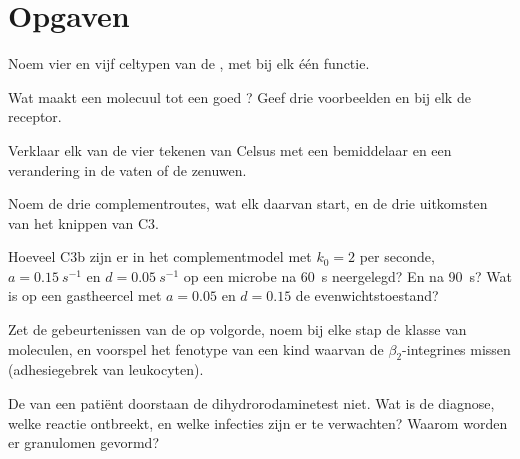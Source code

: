 \section{Opgaven}

\begin{exercise}[$\star$]\label{exo:b3:innate-immunity:1}
Noem vier  en vijf celtypen van de , met bij
elk één functie.
\end{exercise}

\begin{exercise}[$\star$]\label{exo:b3:innate-immunity:2}
Wat maakt een molecuul tot een goed ? Geef drie voorbeelden en bij elk de receptor.
\end{exercise}

\begin{exercise}[$\star$]\label{exo:b3:innate-immunity:3}
Verklaar elk van de vier tekenen van Celsus met een bemiddelaar en een
verandering in de vaten of de zenuwen.
\end{exercise}

\begin{exercise}[$\star$]\label{exo:b3:innate-immunity:4}
Noem de drie complementroutes, wat elk daarvan start, en de drie
uitkomsten van het knippen van C3.
\end{exercise}

\begin{exercise}[$\star\star$]\label{exo:b3:innate-immunity:5}
Hoeveel C3b zijn er in het complementmodel met $k_{0} = 2$ per seconde, $a =
\qty{0.15}{s^{-1}}$ en $d = \qty{0.05}{s^{-1}}$ op een microbe na
\qty{60}{s} neergelegd? En na \qty{90}{s}? Wat is op een gastheercel
met $a = 0.05$ en $d = 0.15$ de evenwichtstoestand?
\end{exercise}

\begin{exercise}[$\star\star$]\label{exo:b3:innate-immunity:6}
Zet de gebeurtenissen van de  op volgorde, noem bij elke
stap de klasse van moleculen, en voorspel het fenotype van een kind
waarvan de  $\beta_{2}$-integrines missen (adhesiegebrek van
leukocyten).
\end{exercise}

\begin{exercise}[$\star\star$]\label{exo:b3:innate-immunity:7}
De  van een patiënt doorstaan de dihydrorodaminetest niet.
Wat is de diagnose, welke reactie ontbreekt, en welke infecties zijn er
te verwachten? Waarom worden er granulomen gevormd?
\end{exercise}

